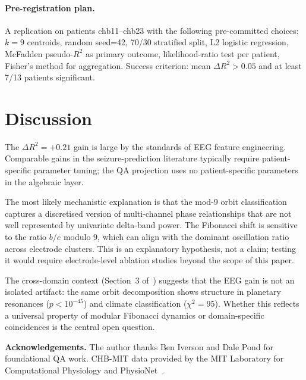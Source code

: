 \documentclass[11pt]{article}
\begin{document}
\paragraph{Pre-registration plan.}
A replication on patients chb11--chb23 with the following pre-committed choices:
$k=9$ centroids, random seed=42, 70/30 stratified split, L2 logistic regression,
McFadden pseudo-$R^2$ as primary outcome, likelihood-ratio test per patient,
Fisher's method for aggregation.
Success criterion: mean $\Delta R^2 > 0.05$ and at least 7/13 patients significant.

\section{Discussion}\label{sec:discussion}

The $\Delta R^2 = +0.21$ gain is large by the standards of EEG feature engineering.
Comparable gains in the seizure-prediction literature typically require
patient-specific parameter tuning; the QA projection uses no patient-specific
parameters in the algebraic layer.

The most likely mechanistic explanation is that the mod-9 orbit classification
captures a discretised version of multi-channel phase relationships that are
not well represented by univariate delta-band power.
The Fibonacci shift is sensitive to the ratio $b/e$ modulo 9,
which can align with the dominant oscillation ratio across electrode clusters.
This is an explanatory hypothesis, not a claim; testing it would require
electrode-level ablation studies beyond the scope of this paper.

The cross-domain context (Section~3 of~\cite{dale2026convergence}) suggests
that the EEG gain is not an isolated artifact:
the same orbit decomposition shows structure in planetary resonances ($p < 10^{-45}$)
and climate classification ($\chi^2 = 95$).
Whether this reflects a universal property of modular Fibonacci dynamics
or domain-specific coincidences is the central open question.

\bigskip
\noindent\textbf{Acknowledgements.}
The author thanks Ben Iverson and Dale Pond for foundational QA work.
CHB-MIT data provided by the MIT Laboratory for Computational Physiology
and PhysioNet~\cite{chbmit}.
\end{document}
